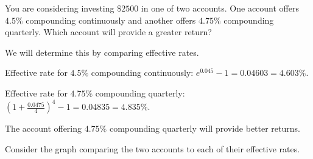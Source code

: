 \begin{example}
    You are considering investing \(\$2500\) in one of two accounts. One account offers \(4.5\%\) compounding continuously and another offers \(4.75\%\) compounding quarterly. Which account will provide a greater return?
    \begin{solution}
        We will determine this by comparing effective rates.
        
        Effective rate for \(4.5\%\) compounding continuously: \(e^{0.045}-1 = 0.04603 = 4.603\%.\)
        
        Effective rate for \(4.75\%\) compounding quarterly: \(\left(1+\frac{0.0475}{4}\right)^4-1 = 0.04835 = 4.835\%.\)

        The account offering \(4.75\%\) compounding quarterly will provide better returns.

        Consider the graph comparing the two accounts to each of their effective rates.

    \end{solution}
\end{example}